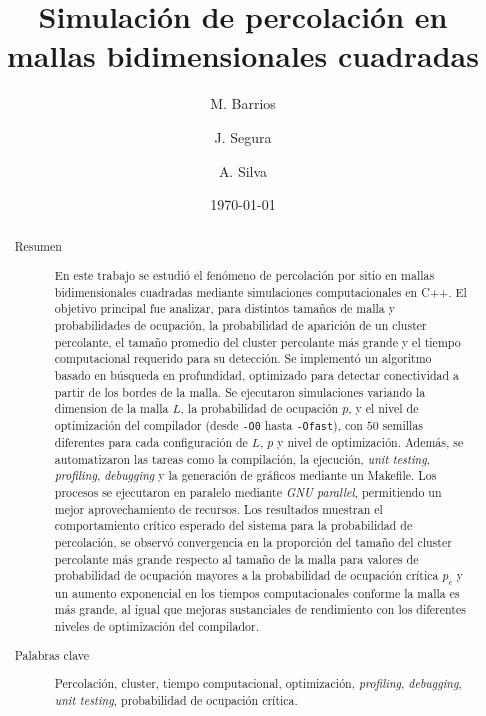 \documentclass[%
 reprint,
 amsmath,amssymb,
 aps,
]{revtex4-2}
\begin{document}

\title{Simulación de percolación en mallas bidimensionales cuadradas}%

 
\author{M. Barrios}
\author{J. Segura}
\author{A. Silva}
%
\date{\today}%
\begin{abstract}
\begin{description}
\item[Resumen] En este trabajo se estudió el fenómeno de percolación por sitio en mallas bidimensionales cuadradas mediante simulaciones computacionales en C++. El objetivo principal fue analizar, para distintos tamaños de malla y probabilidades de ocupación, la probabilidad de aparición de un cluster percolante, el tamaño promedio del cluster percolante más grande y el tiempo computacional requerido para su detección. Se implementó un algoritmo basado en búsqueda en profundidad, optimizado para detectar conectividad a partir de los bordes de la malla. Se ejecutaron simulaciones variando la dimension de la malla $L$, la probabilidad de ocupación $p$, y el nivel de optimización del compilador (desde \texttt{-O0} hasta \texttt{-Ofast}), con $50$ semillas diferentes para cada configuración de $L$, $p$ y nivel de optimización. Además, se automatizaron las tareas como la compilación, la ejecución, \textit{unit testing}, \textit{profiling}, \textit{debugging} y la generación de gráficos mediante un Makefile. Los procesos se ejecutaron en paralelo mediante \textit{GNU parallel}, permitiendo un mejor aprovechamiento de recursos. Los resultados muestran el comportamiento crítico esperado del sistema para la probabilidad de percolación, se observó convergencia en la proporción del tamaño del cluster percolante más grande respecto al tamaño de la malla para valores de probabilidad de ocupación mayores a la probabilidad de ocupación crítica $p_c$ y un aumento exponencial en los tiempos computacionales conforme la malla es más grande, al igual que mejoras sustanciales de rendimiento con los diferentes niveles de optimización del compilador.


\end{description}
\begin{description}
\item[Palabras clave] Percolación, cluster, tiempo computacional, optimización, \textit{profiling}, \textit{debugging}, \textit{unit testing}, probabilidad de ocupación crítica.

\end{description}
\end{abstract}
\end{document}
